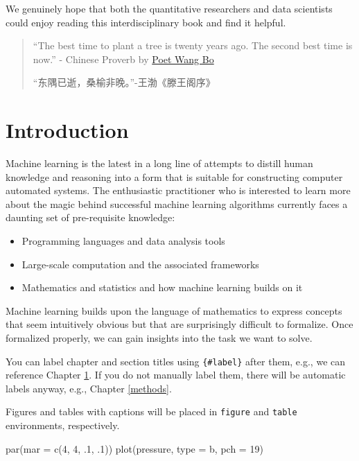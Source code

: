 \documentclass[
]{book}
\newenvironment{Shaded}{\begin{snugshade}}{\end{snugshade}}
\newcommand{\AttributeTok}[1]{\textcolor[rgb]{0.77,0.63,0.00}{#1}}
\newcommand{\DecValTok}[1]{\textcolor[rgb]{0.00,0.00,0.81}{#1}}
\newcommand{\FunctionTok}[1]{\textcolor[rgb]{0.00,0.00,0.00}{#1}}
\newcommand{\NormalTok}[1]{#1}
\newcommand{\StringTok}[1]{\textcolor[rgb]{0.31,0.60,0.02}{#1}}
\begin{document}
We genuinely hope that both the quantitative researchers and data scientists could enjoy reading this interdisciplinary book and find it helpful.

\begin{quote}
``The best time to plant a tree is twenty years ago. The second best time is now.'' - Chinese Proverb by \href{https://en.wikipedia.org/wiki/Wang_Bo_(poet)}{Poet Wang Bo}

``东隅已逝，桑榆非晚。''-王渤《滕王阁序》
\end{quote}

\hypertarget{intro}{%
\chapter{Introduction}\label{intro}}

Machine learning is the latest in a long line of attempts to distill human knowledge and reasoning into a form that is suitable for constructing computer automated systems. The enthusiastic practitioner who is interested to learn more about the magic behind successful machine learning algorithms currently faces a daunting set of pre-requisite knowledge:

\begin{itemize}
\item
  Programming languages and data analysis tools
\item
  Large-scale computation and the associated frameworks
\item
  Mathematics and statistics and how machine learning builds on it
\end{itemize}

Machine learning builds upon the language of mathematics to express concepts that seem intuitively obvious but that are surprisingly difficult to formalize. Once formalized properly, we can gain insights into the task we want to solve.

You can label chapter and section titles using \texttt{\{\#label\}} after them, e.g., we can reference Chapter \ref{intro}. If you do not manually label them, there will be automatic labels anyway, e.g., Chapter \ref{methods}.

Figures and tables with captions will be placed in \texttt{figure} and \texttt{table} environments, respectively.

\begin{Shaded}
\begin{Highlighting}[]
\FunctionTok{par}\NormalTok{(}\AttributeTok{mar =} \FunctionTok{c}\NormalTok{(}\DecValTok{4}\NormalTok{, }\DecValTok{4}\NormalTok{, .}\DecValTok{1}\NormalTok{, .}\DecValTok{1}\NormalTok{))}
\FunctionTok{plot}\NormalTok{(pressure, }\AttributeTok{type =} \StringTok{\textquotesingle{}b\textquotesingle{}}\NormalTok{, }\AttributeTok{pch =} \DecValTok{19}\NormalTok{)}
\end{Highlighting}
\end{Shaded}
\end{document}

